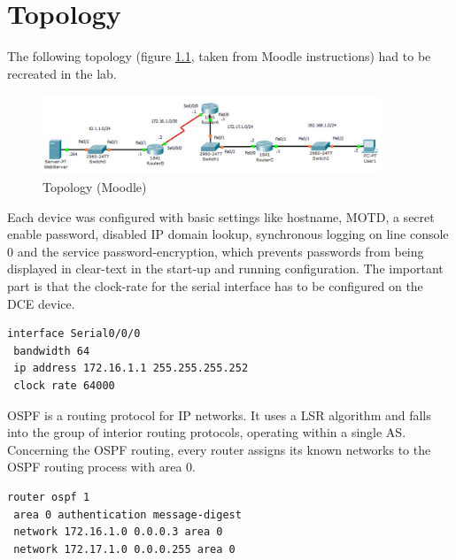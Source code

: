 \chapter{Topology}

\thispagestyle{standard}
\pagestyle{standard}

The following topology (figure \ref{img:topo}, taken from Moodle instructions) had to be recreated in the lab.

\begin{figure}[H]
	\centering
	\includegraphics[width=0.9\textwidth]{img/topo.png}
	\caption{Topology (Moodle)}
	\label{img:topo}
\end{figure}

Each device was configured with basic settings like hostname, \ac{MOTD}, a secret enable password, disabled IP domain lookup, synchronous logging on line console 0 and the service password-encryption, which prevents passwords from being displayed in clear-text in the start-up and running configuration. The important part is that the clock-rate for the serial interface has to be configured on the \ac{DCE} device.

\begin{lstlisting}[caption={Setting the clock-rate on Router A},label={lst:clockrate},language={}]
interface Serial0/0/0
 bandwidth 64
 ip address 172.16.1.1 255.255.255.252
 clock rate 64000
\end{lstlisting}

\ac{OSPF} is a routing protocol for \ac{IP} networks. It uses a \ac{LSR} algorithm and falls into the group of interior routing protocols, operating within a single \ac{AS}.
Concerning the \ac{OSPF} routing, every router assigns its known networks to the \ac{OSPF} routing process with area 0.
\newpage
{}%
\begin{lstlisting}[caption={\ac{OSPF} routing example router A},label={lst:ospf},language={}]
router ospf 1
 area 0 authentication message-digest
 network 172.16.1.0 0.0.0.3 area 0
 network 172.17.1.0 0.0.0.255 area 0
\end{lstlisting}

